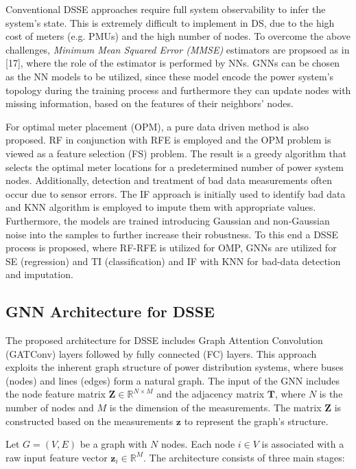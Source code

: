 \documentclass[journal]{IEEEtran}  %
\begin{document}
Conventional DSSE approaches require full system observability to infer the system's state. This is extremely difficult to implement in DS, due to the high cost of meters (e.g. PMUs) and the high number of nodes. To overcome the above challenges, \textit{Minimum Mean Squared Error (MMSE)} estimators are propsoed as in [17], where the role of the estimator is performed by NNs. GNNs can be chosen as the NN models to be utilized, since these model encode the power system's topology during the training process and furthermore they can update nodes with missing information, based on the features of their neighbors' nodes.

For optimal meter placement (OPM), a pure data driven method is also proposed. RF in conjunction with RFE is employed and the OPM problem is viewed as a feature selection (FS) problem. The result is a greedy algorithm that selects the optimal meter locations for a predetermined number of power system nodes. Additionally, detection and treatment of bad data measurements often occur due to sensor errors. The IF approach is initially used to identify bad data and KNN algorithm is employed to impute them with appropriate values. Furthermore, the models are trained introducing Gaussian and non-Gaussian noise into the samples to further increase their robustness. To this end a DSSE process is proposed, where RF-RFE is utilized for OMP, GNNs are utilized for SE (regression) and TI (classification) and IF with KNN for bad-data detection and imputation.

\subsection{GNN Architecture for DSSE}

The proposed architecture for DSSE includes Graph Attention Convolution (GATConv) layers followed by fully connected (FC) layers. This approach exploits the inherent graph structure of power distribution systems, where buses (nodes) and lines (edges) form a natural graph. The input of the GNN includes the node feature matrix \( \mathbf{Z} \in \mathbb{R}^{N \times M} \) and the adjacency matrix \( \mathbf{T} \), where \( N \) is the number of nodes and \( M \) is the dimension of the measurements. The matrix \( \mathbf{Z} \) is constructed based on the measurements \( \mathbf{z} \) to represent the graph's structure.

Let $G = (V, E)$ be a graph with $N$ nodes. Each node $i \in V$ is associated with a raw input feature vector $\mathbf{z}_i \in \mathbb{R}^M$. The architecture consists of three main stages:
\end{document}
